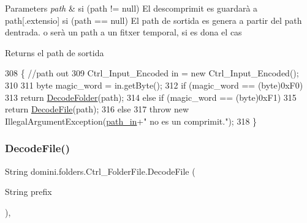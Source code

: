\begin{DoxyParams}{Parameters}
{\em path} & si (path != null) El descomprimit es guardarà a path\mbox{[}.extensio\mbox{]} si (path == null) El path de sortida es genera a partir del path d\textquotesingle{}entrada. o serà un path a un fitxer temporal, si es dona el cas \\
\hline
\end{DoxyParams}
\begin{DoxyReturn}{Returns}
el path de sortida 
\end{DoxyReturn}

\begin{DoxyCode}
308                                        \{ \textcolor{comment}{//path out}
309         Ctrl\_Input\_Encoded in = \textcolor{keyword}{new} Ctrl\_Input\_Encoded();
310 
311         byte magic\_word = in.getByte();
312         \textcolor{keywordflow}{if} (magic\_word == (byte)0xF0)
313             \textcolor{keywordflow}{return} \hyperlink{classdomini_1_1folders_1_1Ctrl__FolderFile_ae8f46feaced983c27c6537794f823dd8}{DecodeFolder}(path);
314         \textcolor{keywordflow}{else} \textcolor{keywordflow}{if} (magic\_word == (byte)0xF1) 
315             \textcolor{keywordflow}{return} \hyperlink{classdomini_1_1folders_1_1Ctrl__FolderFile_aa12178fff5fbb832759b7328cbdb4415}{DecodeFile}(path);
316         \textcolor{keywordflow}{else}
317             \textcolor{keywordflow}{throw} \textcolor{keyword}{new} IllegalArgumentException(\hyperlink{classdomini_1_1folders_1_1Ctrl__FolderFile_a0d3946bb2832a1f34d0c2227df5c71c4}{path\_in}+\textcolor{stringliteral}{" no es un comprimit."});
318     \}
\end{DoxyCode}
\mbox{\label{classdomini_1_1folders_1_1Ctrl__FolderFile_aa12178fff5fbb832759b7328cbdb4415}} 
\subsubsection{\texorpdfstring{Decode\+File()}{DecodeFile()}}
{\footnotesize\ttfamily String domini.\+folders.\+Ctrl\+\_\+\+Folder\+File.\+Decode\+File (\begin{DoxyParamCaption}\item[{String}]{prefix }\end{DoxyParamCaption})\hspace{0.3cm}{\ttfamily [inline]}, {\ttfamily [private]}}



